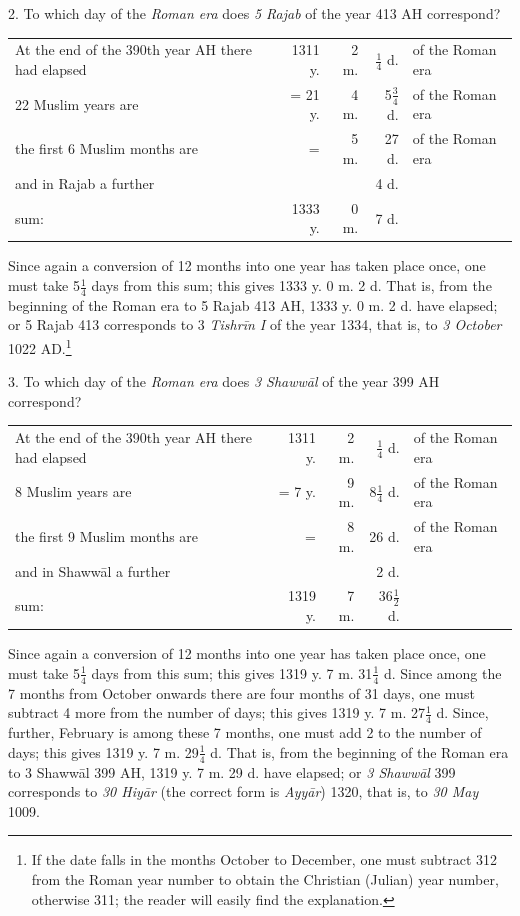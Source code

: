\documentclass[11pt]{article}
\newcommand{\Pg}[1]{\marginpar{\footnotesize\color{gray}#1}}
\begin{document}
\par 2. To which day of the \emph{Roman era} does \emph{5 Rajab} of the year 413 AH correspond?\par
\Pg{39}\begin{center}\small\begin{tabular}{lrrrl}
At the end of the 390th year AH there had elapsed & 1311 y. & 2 m. & $\tfrac{1}{4}$ d. & of the Roman era \\
22 Muslim years are & = 21 y. & 4 m. & 5$\tfrac{3}{4}$ d. & of the Roman era \\
the first 6 Muslim months are & = & 5 m. & 27 d. & of the Roman era \\
and in Rajab a further &  &  & 4 d. &  \\
sum: & 1333 y. & 0 m. & 7 d. &  \\
\end{tabular}\end{center}
\par Since again a conversion of 12 months into one year has taken place once, one must take 5$\tfrac{1}{4}$ days from this sum; this gives 1333 y. 0 m. 2 d. That is, from the beginning of the Roman era to 5 Rajab 413 AH, 1333 y. 0 m. 2 d. have elapsed; or 5 Rajab 413 corresponds to 3 \emph{Tishrīn I} of the year 1334, that is, to \emph{3 October} 1022 AD.\footnote{If the date falls in the months October to December, one must subtract 312 from the Roman year number to obtain the Christian (Julian) year number, otherwise 311; the reader will easily find the explanation.}\par
\par 3. To which day of the \emph{Roman era} does \emph{3 Shawwāl} of the year 399 AH correspond?\par
\begin{center}\small\begin{tabular}{lrrrl}
At the end of the 390th year AH there had elapsed & 1311 y. & 2 m. & $\tfrac{1}{4}$ d. & of the Roman era \\
8 Muslim years are & = 7 y. & 9 m. & 8$\tfrac{1}{4}$ d. & of the Roman era \\
the first 9 Muslim months are & = & 8 m. & 26 d. & of the Roman era \\
and in Shawwāl a further &  &  & 2 d. &  \\
sum: & 1319 y. & 7 m. & 36$\tfrac{1}{2}$ d. &  \\
\end{tabular}\end{center}
\par Since again a conversion of 12 months into one year has taken place once, one must take 5$\tfrac{1}{4}$ days from this sum; this gives 1319 y. 7 m. 31$\tfrac{1}{4}$ d. Since among the 7 months from October onwards there are four months of 31 days, one must subtract 4 more from the number of days; this gives 1319 y. 7 m. 27$\tfrac{1}{4}$ d. Since, further, February is among these 7 months, one must add 2 to the number of days; this gives 1319 y. 7 m. 29$\tfrac{1}{4}$ d. That is, from the beginning of the Roman era to 3 Shawwāl 399 AH, 1319 y. 7 m. 29 d. have elapsed; or \emph{3 Shawwāl} 399 corresponds to \emph{30 Hiyār} (the correct form is \emph{Ayyār}) 1320, that is, to \emph{30 May} 1009.\par
\end{document}
